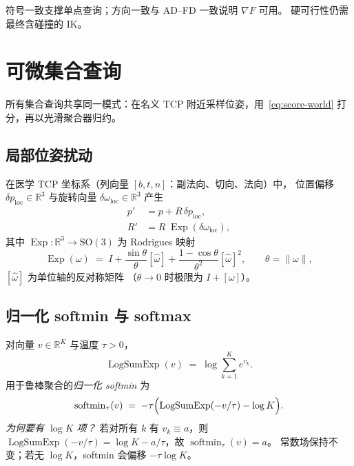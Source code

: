 \documentclass[UTF8,a4paper,11pt,fontset=fandol]{ctexart}
\newcommand{\SO}{\mathrm{SO}}
\newcommand{\R}{\mathbb{R}}
\newcommand{\softmin}{\operatorname{softmin}}
\newcommand{\LogSumExp}{\operatorname{LogSumExp}}
\begin{document}
符号一致支撑单点查询；方向一致与 AD--FD 一致说明 \(\nabla F\) 可用。
硬可行性仍需最终含碰撞的 IK。

\section{可微集合查询}
\label{sec:region}

所有集合查询共享同一模式：在名义 TCP 附近采样位姿，用~\eqref{eq:score-world}
打分，再以光滑聚合器归约。

\subsection{局部位姿扰动}
\label{sec:perturb}

在医学 TCP 坐标系（列向量 \([b,t,n]\)：副法向、切向、法向）中，
位置偏移 \(\delta p_{\mathrm{loc}}\in\R^{3}\) 与旋转向量
\(\delta\omega_{\mathrm{loc}}\in\R^{3}\) 产生
\begin{equation}
\label{eq:perturb}
\begin{aligned}
  p'
  &=
  p + R\,\delta p_{\mathrm{loc}},
  \\
  R'
  &=
  R\;\operatorname{Exp}(\delta\omega_{\mathrm{loc}}),
\end{aligned}
\end{equation}
其中 \(\operatorname{Exp}:\R^{3}\to\SO(3)\) 为 Rodrigues 映射
\begin{equation}
\label{eq:rodrigues}
  \operatorname{Exp}(\omega)
  \;=\;
  I
  +
  \frac{\sin\theta}{\theta}[\hat\omega]
  +
  \frac{1-\cos\theta}{\theta^{2}}[\hat\omega]^{2},
  \qquad
  \theta=\|\omega\|,
\end{equation}
\([\hat\omega]\) 为单位轴的反对称矩阵
（\(\theta\to 0\) 时极限为 \(I+[\omega]\)）。

\subsection{归一化 softmin 与 softmax}
\label{sec:soft}

对向量 \(v\in\R^{K}\) 与温度 \(\tau>0\)，
\begin{equation}
\label{eq:logsumexp}
  \LogSumExp(v)
  \;=\;
  \log\sum_{k=1}^{K} e^{v_{k}}.
\end{equation}
用于鲁棒聚合的\emph{归一化 softmin} 为
\begin{equation}
\label{eq:softmin}
  \softmin_{\tau}(v)
  \;=\;
  -\tau\Bigl(
    \LogSumExp(-v/\tau)
    -
    \log K
  \Bigr).
\end{equation}
\emph{为何要有 \(\log K\) 项？}
若对所有 \(k\) 有 \(v_{k}\equiv a\)，则
\(\LogSumExp(-v/\tau)=\log K - a/\tau\)，故 \(\softmin_{\tau}(v)=a\)。
常数场保持不变；若无 \(\log K\)，softmin 会偏移 \(-\tau\log K\)。
\end{document}

